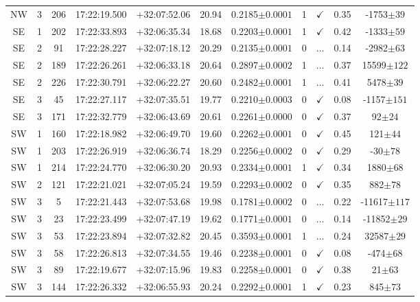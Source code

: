 \begin{landscape}
\begin{longtable}{ccccccccccc}
	NW & 3 & 206 & 17:22:19.500 & +32:07:52.06 & 20.94 & 0.2185$\pm{0.0001}$ & 1 & $\checkmark$ & 0.35 & -1753$\pm{39}$ \\
	SE & 1 & 202 & 17:22:33.893 & +32:06:35.34 & 18.68 & 0.2203$\pm{0.0001}$ & 1 & $\checkmark$ & 0.42 & -1333$\pm{59}$ \\
	SE & 2 & 91 & 17:22:28.227 & +32:07:18.12 & 20.29 & 0.2135$\pm{0.0001}$ & 0 & ... & 0.14 & -2982$\pm{63}$ \\
	SE & 2 & 189 & 17:22:26.261 & +32:06:33.18 & 20.64 & 0.2897$\pm{0.0002}$ & 1 & ... & 0.37 & 15599$\pm{122}$ \\
	SE & 2 & 226 & 17:22:30.791 & +32:06:22.27 & 20.60 & 0.2482$\pm{0.0001}$ & 1 & ... & 0.41 & 5478$\pm{39}$ \\
	SE & 3 & 45 & 17:22:27.117 & +32:07:35.51 & 19.77 & 0.2210$\pm{0.0003}$ & 0 & $\checkmark$ & 0.08 & -1157$\pm{151}$ \\
	SE & 3 & 171 & 17:22:32.779 & +32:06:43.69 & 20.61 & 0.2261$\pm{0.0000}$ & 0 & $\checkmark$ & 0.37 & 92$\pm{24}$ \\
	SW & 1 & 160 & 17:22:18.982 & +32:06:49.70 & 19.60 & 0.2262$\pm{0.0001}$ & 0 & $\checkmark$ & 0.45 & 121$\pm{44}$ \\
	SW & 1 & 203 & 17:22:26.919 & +32:06:36.74 & 18.29 & 0.2256$\pm{0.0002}$ & 0 & $\checkmark$ & 0.29 & -30$\pm{78}$ \\
	SW & 1 & 214 & 17:22:24.770 & +32:06:30.20 & 20.93 & 0.2334$\pm{0.0001}$ & 1 & $\checkmark$ & 0.34 & 1880$\pm{68}$ \\
	SW & 2 & 121 & 17:22:21.021 & +32:07:05.24 & 19.59 & 0.2293$\pm{0.0002}$ & 0 & $\checkmark$ & 0.35 & 882$\pm{78}$ \\
	SW & 3 & 5 & 17:22:21.443 & +32:07:53.68 & 19.98 & 0.1781$\pm{0.0002}$ & 0 & ... & 0.22 & -11617$\pm{117}$ \\
	SW & 3 & 23 & 17:22:23.499 & +32:07:47.19 & 19.62 & 0.1771$\pm{0.0001}$ & 0 & ... & 0.14 & -11852$\pm{29}$ \\
	SW & 3 & 53 & 17:22:23.894 & +32:07:32.82 & 20.45 & 0.3593$\pm{0.0001}$ & 1 & ... & 0.24 & 32587$\pm{29}$ \\
	SW & 3 & 58 & 17:22:26.813 & +32:07:34.55 & 19.46 & 0.2238$\pm{0.0001}$ & 0 & $\checkmark$ & 0.08 & -474$\pm{68}$ \\
	SW & 3 & 89 & 17:22:19.677 & +32:07:15.96 & 19.83 & 0.2258$\pm{0.0001}$ & 0 & $\checkmark$ & 0.38 & 21$\pm{63}$ \\
	SW & 3 & 144 & 17:22:26.332 & +32:06:55.93 & 20.24 & 0.2292$\pm{0.0001}$ & 1 & $\checkmark$ & 0.23 & 845$\pm{73}$ \\

\end{longtable}
\end{landscape}
